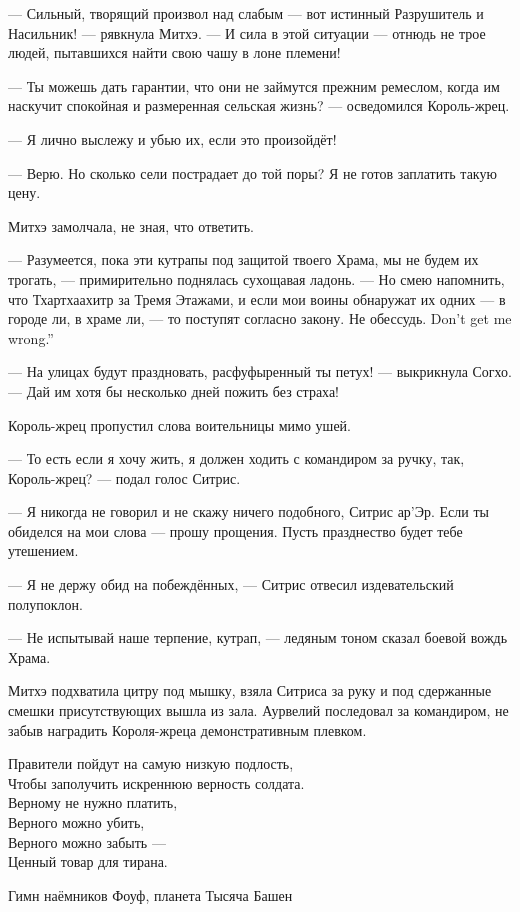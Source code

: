 --- Сильный, творящий произвол над слабым --- вот истинный Разрушитель и Насильник! --- рявкнула Митхэ.
--- И сила в этой ситуации --- отнюдь не трое людей, пытавшихся найти свою чашу в лоне племени!

--- Ты можешь дать гарантии, что они не займутся прежним ремеслом, когда им наскучит спокойная и размеренная сельская жизнь? --- осведомился Король-жрец.

--- Я лично выслежу и убью их, если это произойдёт!

--- Верю.
Но сколько сели пострадает до той поры?
Я не готов заплатить такую цену.

Митхэ замолчала, не зная, что ответить.

--- Разумеется, пока эти кутрапы под защитой твоего Храма, мы не будем их трогать, --- примирительно поднялась сухощавая ладонь.
--- Но смею напомнить, что Тхартхаахитр за Тремя Этажами, и если мои воины обнаружат их одних --- в городе ли, в храме ли, --- то поступят согласно закону.
{Не обессудь.}
{Don't get me wrong.''}

--- На улицах будут праздновать, расфуфыренный ты петух! --- выкрикнула Согхо.
--- Дай им хотя бы несколько дней пожить без страха!

Король-жрец пропустил слова воительницы мимо ушей.

--- То есть если я хочу жить, я должен ходить с командиром за ручку, так, Король-жрец? --- подал голос Ситрис.

--- Я никогда не говорил и не скажу ничего подобного, Ситрис ар'Эр.
Если ты обиделся на мои слова --- прошу прощения.
Пусть празднество будет тебе утешением.

--- Я не держу обид на побеждённых, --- Ситрис отвесил издевательский полупоклон.

--- Не испытывай наше терпение, кутрап, --- ледяным тоном сказал боевой вождь Храма.

Митхэ подхватила цитру под мышку, взяла Ситриса за руку и под сдержанные смешки присутствующих вышла из зала.
Аурвелий последовал за командиром, не забыв наградить Короля-жреца демонстративным плевком.

\asterism

\epigraph
{Правители пойдут на самую низкую подлость,\\
Чтобы заполучить искреннюю верность солдата.\\
Верному не нужно платить,\\
Верного можно убить,\\
Верного можно забыть ---\\
Ценный товар для тирана.}
{Гимн наёмников Фоуф, планета Тысяча Башен}

